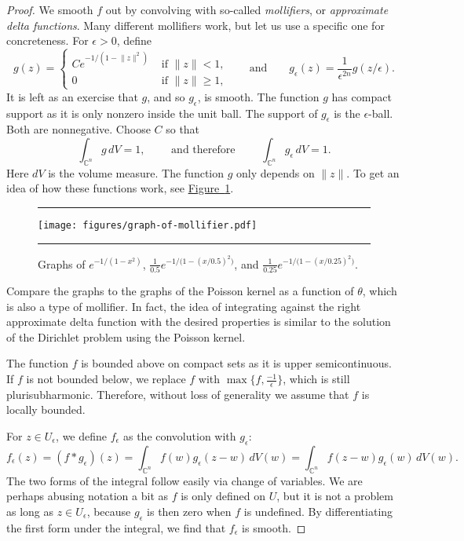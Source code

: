\documentclass[12pt,openany]{book}
\newcommand{\snorm}[1]{\lVert {#1} \rVert}
\newcommand{\C}{{\mathbb{C}}}
\theoremstyle{plain}
\theoremstyle{remark}
\theoremstyle{definition}
\newenvironment{myfig}{%
\begin{figure}[h!t]
\noindent\rule{\textwidth}{0.5pt}\vspace{12pt}\par\centering}%
{\par\noindent\rule{\textwidth}{0.5pt}
\end{figure}}
\theoremstyle{exercise}
\theoremstyle{example}
\newcommand{\figureref}[1]{\hyperref[#1]{Figure~\ref*{#1}}}
\begin{document}
\begin{proof}
We smooth $f$ out by convolving with so-called
\emph{mollifiers}, or
\emph{approximate delta functions}.
Many different mollifiers 
work, but let us use a specific one for concreteness.
For $\epsilon > 0$, define 
\begin{equation*}
g(z) = 
\begin{cases}
C e^{-1/(1-\snorm{z}^2)} & \text{ if $\snorm{z} < 1$,}
\\
0 & \text{ if $\snorm{z} \geq 1$,}
\end{cases}
\qquad
\text{and}
\qquad
g_\epsilon(z) = \frac{1}{\epsilon^{2n}} g(z/\epsilon) .
\end{equation*}
It is left as an exercise that $g$, and so $g_\epsilon$, is smooth.
The function $g$ has compact
support as it is only nonzero inside the unit ball.  The support of
$g_\epsilon$ is the $\epsilon$-ball.  Both are nonnegative.  Choose $C$ so that
\begin{equation*}
\int_{\C^n} g\, dV = 1 ,
\qquad \text{ and therefore } \qquad
\int_{\C^n} g_\epsilon\, dV = 1 .
\end{equation*}
%
Here $dV$ is the volume measure.
The function $g$ only depends on $\snorm{z}$.
To get an idea of
how these functions work,
see \figureref{fig:graph-of-mollifier}.

\begin{myfig}
\texttt{[image: figures/graph-of-mollifier.pdf]}
\caption{Graphs of $e^{-1/(1-x^2)}$,
$\frac{1}{0.5}e^{-1/\bigl(1-{(x/0.5)}^2\bigr)}$, and
$\frac{1}{0.25}e^{-1/\bigl(1-{(x/0.25)}^2\bigr)}$.\label{fig:graph-of-mollifier}}
\end{myfig}

Compare the graphs to the graphs of the Poisson kernel as a function of
$\theta$, which is also a type of mollifier.  In fact, the idea of
integrating against the right approximate delta function with the desired properties
is similar to the solution of the Dirichlet
problem using the Poisson kernel.

The function $f$ is bounded above on compact sets as it is upper semicontinuous.
If $f$ is not bounded below, we replace $f$ with $\max \bigl\{ f ,
\frac{-1}{\epsilon}
\bigr\}$, which is still plurisubharmonic.  Therefore, without loss of generality
we assume that $f$ is locally bounded.

For $z \in U_\epsilon$, we define $f_\epsilon$ as
the convolution with $g_\epsilon$:
%
\begin{equation*}
f_\epsilon(z) = (f * g_\epsilon)(z) =
\int_{\C^n} f(w) g_\epsilon (z-w) \, dV(w) =
\int_{\C^n} f(z-w) g_\epsilon (w) \, dV(w) .
\end{equation*}
The two forms of the integral follow easily via change of variables.
We are perhaps abusing notation a bit as $f$ is only defined on $U$,
but it is not a problem as long as $z \in
U_\epsilon$, because $g_\epsilon$ is then zero when $f$ is undefined.
By differentiating the first form under the integral, we find that
$f_\epsilon$ is smooth.


\end{proof}
\end{document}
